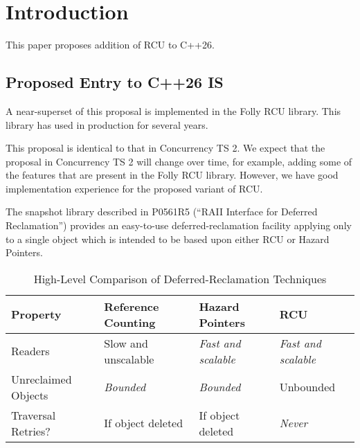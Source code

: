
\chapter{Introduction}
\label{chp:Introduction}

This paper proposes addition of RCU to C++26.

\section{Proposed Entry to C++26 IS}
\label{sec:Proposed Entry to C++26 IS}

A near-superset of this proposal is implemented in the Folly RCU library.
This library has used in production for several years.

This proposal is identical to that in Concurrency TS 2.
We expect that the proposal in Concurrency TS 2 will change over
time, for example, adding some of the features that are present in
the Folly RCU library.
However, we have good implementation experience for the proposed
variant of RCU.

The snapshot library described in P0561R5 (``RAII Interface for Deferred
Reclamation'') provides an easy-to-use deferred-reclamation facility
applying only to a single object which is intended to be based upon
either RCU or Hazard Pointers.

\begin{table*}
\renewcommand*{\arraystretch}{1.25}
\footnotesize
\centering
\begin{tabular}{l|lll}
	Property
		& Reference Counting
			& Hazard Pointers
				& RCU \\
	\hline
	\hline
	Readers
		& Slow and unscalable
			& \emph{Fast and scalable}
				& \emph{Fast and scalable} \\
	\hline
	Unreclaimed Objects
		& \emph{Bounded}
			& \emph{Bounded}
				& Unbounded \\
	\hline
	Traversal Retries?
		& If object deleted
			& If object deleted
				& \emph{Never} \\
\end{tabular}
\caption{High-Level Comparison of Deferred-Reclamation Techniques}
\label{tab:High-Level Comparison of Deferred-Reclamation Techniques}
\end{table*}

